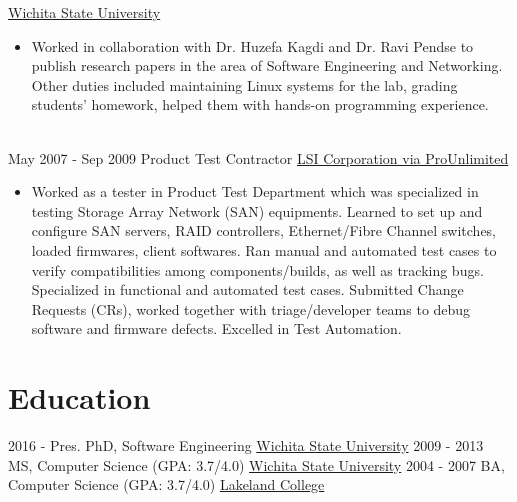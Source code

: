 \documentclass[letterpaper]{twentysecondcv} %
\begin{document}
\begin{twenty}
        {\href{http://www.wichita.edu/thisis/}{Wichita State University}}
        {}
        {
        {\begin{itemize}
        \item Worked in collaboration with Dr. Huzefa Kagdi and Dr. Ravi Pendse to publish research papers in the area of Software Engineering and Networking. Other duties included maintaining Linux systems for the lab, grading students' homework, helped them with hands-on programming experience.
    \end{itemize}}
        }
     \\
     \twentyitem
   		{May 2007 -}
		{Sep 2009}
        {Product Test Contractor}
        {\href{https://en.wikipedia.org/wiki/LSI_Corporation}{LSI Corporation via ProUnlimited}}
        {}
        {
        \begin{itemize}
            \item Worked as a tester in Product Test Department which was specialized in testing Storage Array Network (SAN) equipments. Learned to set up and configure SAN servers, RAID controllers, Ethernet/Fibre Channel switches, loaded firmwares, client softwares. Ran manual and automated test cases to verify compatibilities among components/builds, as well as tracking bugs. Specialized in functional and automated test cases. Submitted Change Requests (CRs), worked together with triage/developer teams to debug software and firmware defects. Excelled in Test Automation.
        \end{itemize}
    	}

\end{twenty}

\section{Education}

\begin{twenty} %
	\twentyitem
    	{2016 - Pres.}
        {}
        {PhD, Software Engineering \textnormal{}}
        {\href{http://www.wichita.edu/thisis/}{Wichita State University}}
        {}
        {}
	\twentyitem
    	{2009 - 2013}
        {}
        {MS, Computer Science \textnormal{(GPA: 3.7/4.0)}}
        {\href{http://www.wichita.edu/thisis/}{Wichita State University}}
        {}
        {}
	\twentyitem
    	{2004 - 2007}
		{}
        {BA, Computer Science \textnormal{(GPA: 3.7/4.0)}}
        {\href{https://lakeland.edu/}{Lakeland College}}
        {}
        {}
\end{twenty}
\end{document}
